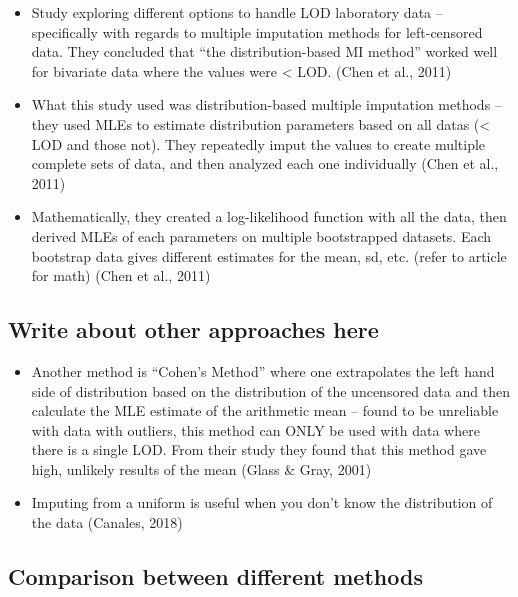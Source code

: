 \documentclass[12pt, twoside]{amherstthesis}
\begin{document}
\begin{itemize}
\item
  Study exploring different options to handle LOD laboratory data -- specifically with regards to multiple imputation methods for left-censored data. They concluded that ``the distribution-based MI method'' worked well for bivariate data where the values were \textless{} LOD. (Chen et al., 2011)
\item
  What this study used was distribution-based multiple imputation methods -- they used MLEs to estimate distribution parameters based on all datas (\textless{} LOD and those not). They repeatedly imput the values to create multiple complete sets of data, and then analyzed each one individually (Chen et al., 2011)
\item
  Mathematically, they created a log-likelihood function with all the data, then derived MLEs of each parameters on multiple bootstrapped datasets. Each bootstrap data gives different estimates for the mean, sd, etc. (refer to article for math) (Chen et al., 2011)
\end{itemize}
\hypertarget{write-about-other-approaches-here}{%
\subsection{Write about other approaches here}\label{write-about-other-approaches-here}}
\begin{itemize}
\item
  Another method is ``Cohen's Method'' where one extrapolates the left hand side of distribution based on the distribution of the uncensored data and then calculate the MLE estimate of the arithmetic mean -- found to be unreliable with data with outliers, this method can ONLY be used with data where there is a single LOD. From their study they found that this method gave high, unlikely results of the mean (Glass \& Gray, 2001)
\item
  Imputing from a uniform is useful when you don't know the distribution of the data (Canales, 2018)
\end{itemize}
\hypertarget{comparison-between-different-methods}{%
\subsection{Comparison between different methods}\label{comparison-between-different-methods}}
\end{document}
